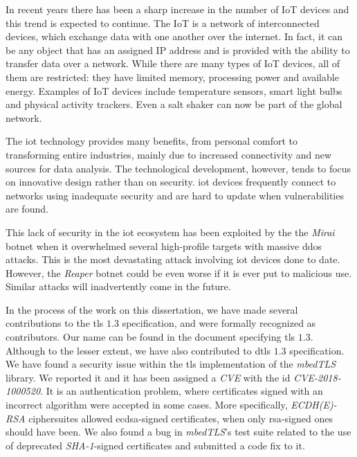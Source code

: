 \documentclass{llncs}
\begin{document}
In recent years there has been a sharp increase in the number of IoT
devices and this trend is expected to continue\cite{IoTnumb83:online}. The IoT is a network
of interconnected devices, which exchange data with one another over
the internet. In fact, it can be any object that has an assigned
IP address and is provided with the ability to transfer data over a network. 
While there are many types of IoT devices, all of them
are restricted: they have limited memory, processing power and
available energy. Examples of IoT devices include temperature sensors,
smart light bulbs and physical activity trackers.
Even a salt shaker\cite{SMALTThe76:online} can now be part of the global network.

The \gls{iot} technology provides many benefits, from personal comfort to
transforming entire industries, mainly due to increased connectivity and
new sources for data analysis. The technological development, however, tends to focus on
innovative design rather than on security. \gls{iot} devices frequently
connect to networks using inadequate security and are hard to update when
vulnerabilities are found.

This lack of security in the \gls{iot} ecosystem has been exploited by the
the \textit{Mirai} botnet\cite{sec17ant94:online} when it overwhelmed several high-profile
targets with massive \gls{ddos} attacks. This is the most devastating attack involving \gls{iot}
devices done to date. However, the \textit{Reaper} botnet\cite{ReaperCa10:online} could be
even worse if it is ever put to malicious use. Similar attacks will inadvertently
come in the future.

In the process of the work on this dissertation, we have made several
contributions to the \gls{tls} $1.3$ specification, and were formally recognized as 
contributors\cite{Mergepul65:online}. Our name can be found in the document specifying \gls{tls} $1.3$\cite{RFC8446}.
Although to the lesser extent, we have also contributed to \gls{dtls} $1.3$ specification\cite{DTLS13:online}.
We have found a security issue within the
\gls{tls} implementation of the \textit{mbedTLS} library. We reported it and it
has been assigned a \textit{CVE} with the id \textit{CVE-2018-1000520}\cite{NVDCVE2094:online}.
It is an authentication problem, where certificates signed with an incorrect algorithm
were accepted in some cases. More specifically, \textit{ECDH(E)-RSA} ciphersuites allowed \gls{ecdsa}-signed
certificates, when only \gls{rsa}-signed ones should have been. We also found a bug in \textit{mbedTLS}'s test suite
related to the use of deprecated \textit{SHA-1}-signed certificates and submitted a code fix to 
it\cite{sslserve89:onelin}\cite{updatete23:online}.
\end{document}
